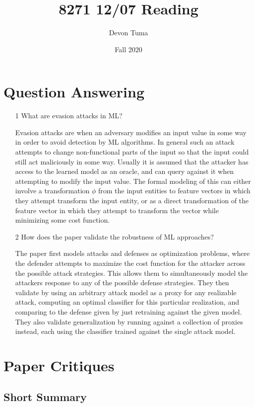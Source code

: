 \documentclass[11pt]{article}
\title{8271 12/07 Reading}
\author{Devon Tuma}
\date{Fall 2020}
\begin{document}
\maketitle

\section*{Question Answering}

\begin{itemize}
\item [1] What are evasion attacks in ML?

  Evasion attacks are when an adversary modifies an input value in some way in order to avoid detection by ML algorithms.
  In general such an attack attempts to change non-functional parts of the input so that the input could still act maliciously in some way.
  Usually it is assumed that the attacker has access to the learned model as an oracle, and can query against it when attempting to modify the input value.
  The formal modeling of this can either involve a transformation $\phi$ from the input entities to feature vectors in which they attempt transform the input entity, or as a direct transformation of the feature vector in which they attempt to transform the vector while minimizing some cost function.
  
\item [2] How does the paper validate the robustness of ML approaches?

  The paper first models attacks and defenses as optimization problems, where the defender attempts to maximize the cost function for the attacker across the possible attack strategies.
  This allows them to simultaneously model the attackers response to any of the possible defense strategies.
  They then validate by using an arbitrary attack model as a proxy for any realizable attack, computing an optimal classifier for this particular realization, and comparing to the defense given by just retraining against the given model.
  They also validate generalization by running against a collection of proxies instead, each using the classifier trained against the single attack model.
  
\end{itemize}

\section*{Paper Critiques}

\subsection*{Short Summary}
\end{document}
